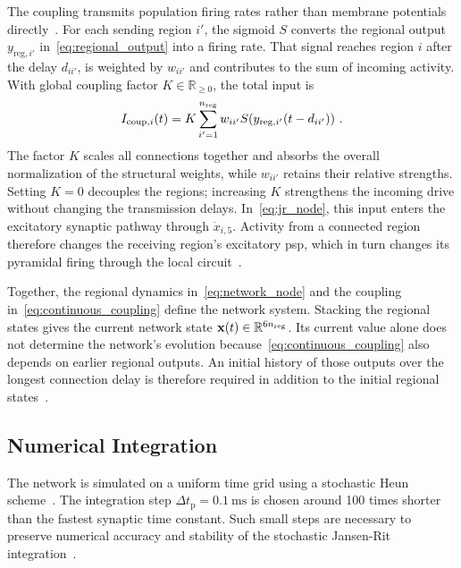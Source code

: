 The coupling transmits population firing rates rather than membrane potentials directly~\cite{SanzLeon2015,Yu2024}.
For each sending region $i'$, the sigmoid $S$ converts the regional output $y_{\mathrm{reg},i'}$ in~\eqref{eq:regional_output} into a firing rate.
That signal reaches region $i$ after the delay $d_{ii'}$, is weighted by $w_{ii'}$ and contributes to the sum of incoming activity.
With global coupling factor $K\in\mathbb{R}_{\geq 0}$, the total input is
%
\begin{equation}
    I_{\mathrm{coup},i}(t)
    =K\sum_{i'=1}^{n_{\mathrm{reg}}{}}w_{ii'}
    S\!\left(y_{\mathrm{reg},i'}(t-d_{ii'})\right)\,.
    \label{eq:continuous_coupling}
\end{equation}
%
The factor $K$ scales all connections together and absorbs the overall normalization of the structural weights, while $w_{ii'}$ retains their relative strengths.
Setting $K=0$ decouples the regions; increasing $K$ strengthens the incoming drive without changing the transmission delays.
In~\eqref{eq:jr_node}, this input enters the excitatory synaptic pathway through $\dot{x}_{i,5}$.
Activity from a connected region therefore changes the receiving region's excitatory \ac{psp}, which in turn changes its pyramidal firing through the local circuit~\cite{SanzLeon2015,Yu2024}.

Together, the regional dynamics in~\eqref{eq:network_node} and the coupling in~\eqref{eq:continuous_coupling} define the network system.
Stacking the regional states gives the current network state $\mathbf{x}(t)\in\mathbb{R}^{6n_{\mathrm{reg}}{}}$.
Its current value alone does not determine the network's evolution because~\eqref{eq:continuous_coupling} also depends on earlier regional outputs.
An initial history of those outputs over the longest connection delay is therefore required in addition to the initial regional states~\cite{SanzLeon2015}.

\subsection{Numerical Integration}

The network is simulated on a uniform time grid using a stochastic Heun scheme~\cite{SanzLeon2015}.
The integration step $\Delta t_\mathrm{p}=\SI{0.1}{\milli\second}$ is chosen around 100 times shorter than the fastest synaptic time constant.
Such small steps are necessary to preserve numerical accuracy and stability of the stochastic Jansen-Rit integration~\cite{Ableidinger2017}.

